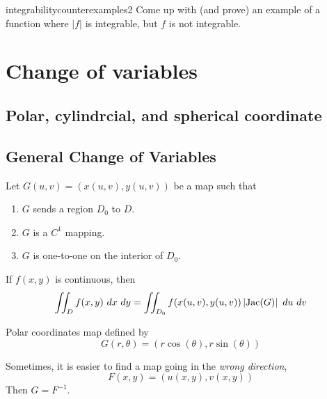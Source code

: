 \begin{problem}{integrabilitycounterexamples2}
Come up with (and prove) an example of a function where $|f|$ is integrable, but $f$ is not integrable.
\end{problem}

\section{Change of variables}

\subsection{Polar, cylindrcial, and spherical coordinate}

\subsection{General Change of Variables}





\begin{theorem}
    Let  $G(u,v) = \left(x(u,v), y(u,v)\right)$ be a map such that
    
    \begin{enumerate}
        \item $G$ sends a region $D_0$ to $D$.  
        \item $G$ is a $C^1$ mapping.
        \item $G$ is one-to-one on the interior of $D_0$.  
    \end{enumerate}

    
    If $f(x,y)$ is continuous, then
    $$\iint_D f(x,y) \ dx \ dy = \iint_{D_0} f(x(u,v), y(u,v)) \left|\textnormal{Jac}(G)\right| \ du \ dv$$
    
\end{theorem}

\begin{example}
    Polar coordinates map defined by $$G(r,\theta) = (r\cos(\theta), r\sin(\theta))$$
\end{example}

\begin{remark}
    Sometimes, it is easier to find a map going in the \textit{wrong direction}, $$F(x,y) = (u(x,y),v(x,y))$$
    Then $G = F^{-1}$.
    \end{remark}
    
    
